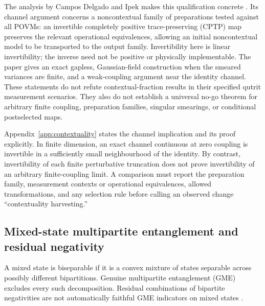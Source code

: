 \documentclass[pdflatex,sn-mathphys-num]{sn-jnl}
\begin{document}
The analysis by Campos Delgado and Ipek makes this qualification concrete \cite{CamposDelgadoIpek2026}. Its channel argument concerns a noncontextual family of preparations tested against all POVMs: an invertible completely positive trace-preserving (CPTP) map preserves the relevant operational equivalences, allowing an initial noncontextual model to be transported to the output family. Invertibility here is linear invertibility; the inverse need not be positive or physically implementable. The paper gives an exact gapless, Gaussian-field construction when the smeared variances are finite, and a weak-coupling argument near the identity channel. These statements do not refute contextual-fraction results in their specified qutrit measurement scenarios. They also do not establish a universal no-go theorem for arbitrary finite coupling, preparation families, singular smearings, or conditional postselected maps.

Appendix~\ref{app:contextuality} states the channel implication and its proof explicitly. In finite dimension, an exact channel continuous at zero coupling is invertible in a sufficiently small neighbourhood of the identity. By contrast, invertibility of each finite perturbative truncation does not prove invertibility of an arbitrary finite-coupling limit. A comparison must report the preparation family, measurement contexts or operational equivalences, allowed transformations, and any selection rule before calling an observed change ``contextuality harvesting.''

\subsection{Mixed-state multipartite entanglement and residual negativity}
\label{subsec:multipartite-topology}
A mixed state is biseparable if it is a convex mixture of states separable across possibly different bipartitions. Genuine multipartite entanglement (GME) excludes every such decomposition. Residual combinations of bipartite negativities are not automatically faithful GME indicators on mixed states \cite{GuhneSeevinck2010,OuFan2007,MaLiShang2025}.
\end{document}
